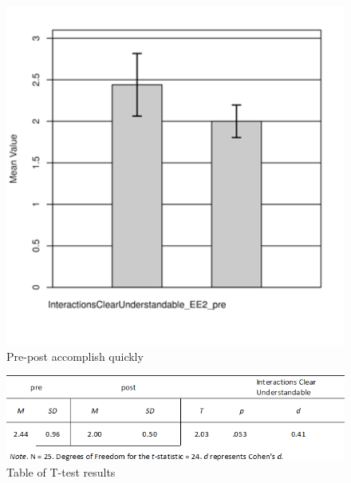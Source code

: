 \documentclass[a4paper, nobind]{templates/ociamthesis}
\begin{document}
\begin{figure}

{\centering \includegraphics[width=5.33in]{clear} 

}

\caption{Pre-post accomplish quickly}\label{fig:accomplishquickly}
\end{figure}

\begin{figure}

{\centering \includegraphics[width=8.64in]{table ttest} 

}

\caption{Table of T-test results}\label{fig:ttest}
\end{figure}
\end{document}

